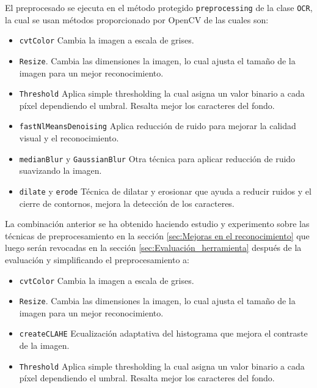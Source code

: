 El preprocesado se ejecuta en el método protegido \texttt{preprocessing} de la clase \texttt{OCR}, la cual se usan métodos proporcionado por OpenCV de las cuales son:
\begin{itemize}
	\item \texttt{cvtColor} Cambia la imagen a escala de grises.
	\item \texttt{Resize}. Cambia las dimensiones la imagen, lo cual ajusta el tamaño de la imagen para un mejor reconocimiento.
	\item \texttt{Threshold} Aplica simple thresholding la cual asigna un valor binario a cada píxel dependiendo el umbral. Resalta mejor los caracteres del fondo.
	\item \texttt{fastNlMeansDenoising} Aplica reducción de ruido para mejorar la calidad visual y el reconocimiento.
	\item \texttt{medianBlur} y \texttt{GaussianBlur} Otra técnica para aplicar reducción de ruido suavizando la imagen.
	\item \texttt{dilate} y \texttt{erode} Técnica de dilatar y erosionar que ayuda a reducir ruidos y el cierre de contornos, mejora la detección de los caracteres.
\end{itemize}
La combinación anterior se ha obtenido haciendo estudio y experimento sobre las técnicas de preprocesamiento en la sección \ref{sec:Mejoras en el reconocimiento} que luego serán revocadas en la sección \ref{sec:Evaluación_herramienta} después de la evaluación y simplificando el preprocesamiento a:
\begin{itemize}
	\item \texttt{cvtColor} Cambia la imagen a escala de grises.
	\item \texttt{Resize}. Cambia las dimensiones la imagen, lo cual ajusta el tamaño de la imagen para un mejor reconocimiento.
	\item \texttt{createCLAHE} Ecualización adaptativa del histograma que mejora el contraste de la imagen.
	\item \texttt{Threshold} Aplica simple thresholding la cual asigna un valor binario a cada píxel dependiendo el umbral. Resalta mejor los caracteres del fondo.
\end{itemize}

